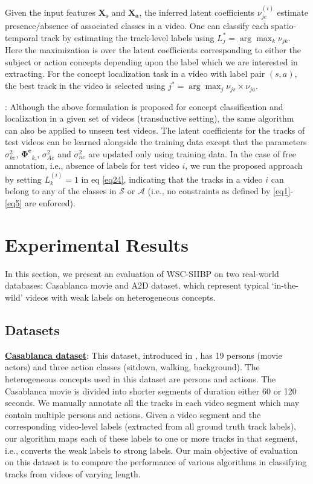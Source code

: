 \documentclass[runningheads]{llncs}
\begin{document}
Given the input features $\mathbf{X_s}$ and $\mathbf{X_a}$, the inferred latent coefficients $\nu_{je}^{(i)}$ estimate presence/absence of associated classes in a video. One can classify each spatio-temporal track by estimating the track-level labels using $L^*_j = \arg\max_{k} \nu_{jk}$. Here the maximization is over the latent coefficients corresponding to either the subject or action concepts depending upon the label which we are interested in extracting. For the concept localization task in a video with label pair $(s,a)$, the best track in the video is selected using $j^* = \arg\max_{j} \nu_{js}\times\nu_{ja}$.

: Although the above formulation is proposed for concept classification and localization in a given set of videos (transductive setting), the same algorithm can also be applied to unseen test videos. The latent coefficients for the tracks of test videos can be learned alongside the training data except that the parameters $\sigma_{ke}^2$, $\mathbf{\Phi^e}_{k.}$, $\sigma_{Ae}^2$ and $\sigma_{ne}^2$ are updated only using training data. In the case of free annotation, i.e., absence of labels for test video $i$, we run the proposed approach by setting $L^{(i)}_k = 1$ in eq \eqref{eq24}, indicating that the tracks in a video $i$ can belong to any of the classes in $\mathcal{S}$ or $\mathcal{A}$ (i.e., no constraints as defined by \eqref{eq1}-\eqref{eq5} are enforced). 

\section{Experimental Results}
\label{sec:experimental_results}

In this section, we present an evaluation of WSC-SIIBP on two real-world databases: Casablanca movie and A2D dataset, which represent typical `in-the-wild' videos with weak labels on heterogeneous concepts.

\subsection{Datasets}
\label{sec:tracks_and_features}

\noindent
\underline{\bf Casablanca dataset}: This dataset, introduced in \cite{bojanowski2013finding}, has 19 persons (movie actors) and three action classes (sitdown, walking, background). The heterogeneous concepts used in this dataset are persons and actions. The Casablanca movie is divided into shorter segments of duration either 60 or 120 seconds. We manually annotate all the tracks in each video segment which may contain multiple persons and actions.
Given a video segment and the corresponding video-level labels (extracted from all ground truth track labels), our algorithm maps each of these labels to one or more tracks in that segment, i.e., converts the weak labels to strong labels. Our main objective of evaluation on this dataset is to compare the performance of various algorithms in classifying tracks from videos of varying length.
\end{document}
